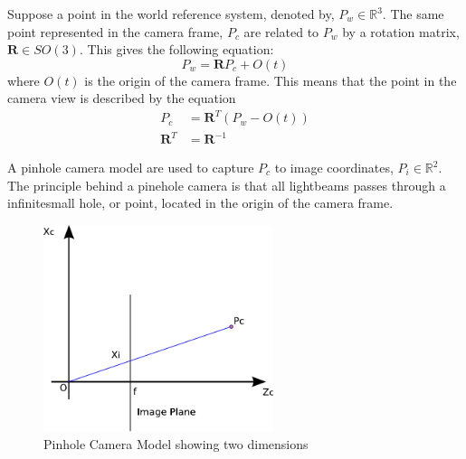 	Suppose a point in the world reference system, denoted by, $P_w \in \mathbb{R}^3$. The same point
	represented in the camera frame, $P_c$ are related to $P_w$ by a rotation matrix, $\mathbf{R} \in
	SO(3)$. This gives the following equation: 
	\begin{equation}
		P_w = \mathbf{R} P_c + O(t)
	\end{equation}
	where $O(t)$ is the origin of the camera frame. This means that the point in the camera view is
	described by the equation
	\begin{equation}
		\label{eq:ch1-P_c}
        \begin{aligned}
		P_c &= \mathbf{R}^T (P_w - O(t)) \\
		\mathbf{R}^T &= \mathbf{R}^{-1} 
        \end{aligned}
	\end{equation}

	A pinhole camera model are used to capture $P_c$ to image coordinates, $P_i \in
	\mathbb{R}^2$. 
	The principle behind a pinehole camera is that all lightbeams passes through a
	infinitesmall hole, or point, located in the origin of the camera frame.   
	\begin{figure}[hbtp]
		\centering
		\includegraphics[width=0.6\textwidth]{pics/pinhole_model}
		\caption{Pinhole Camera Model showing two dimensions}
		\label{fig:ch1-pinhole}
	\end{figure}
			
